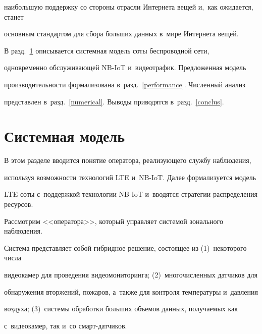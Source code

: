 наибольшую поддержку со стороны отрасли Интернета вещей и,~как ожидается, станет 


основным стандартом для сбора больших данных в~мире Интернета вещей.


{





}





В разд.~\ref{sys} описывается системная модель соты беспроводной сети, 


одновременно обслуживающей NB-IoT и~видеотрафик. Предложенная модель 


производительности формализована в~разд.~\ref{performance}. Численный анализ 


представлен в~разд.~\ref{numerical}. Выводы приводятся в~разд.~\ref{conclus}.





\section{Системная модель}


\label{sys}





В этом разделе вводится понятие оператора, реализующего службу наблюдения, 


используя возможности технологий LTE и~NB-IoT. Далее формализуется модель 


LTE-со\-ты с~поддержкой технологии NB-IoT и~вводятся стратегии распределения ресурсов.





Рассмотрим <<оператора>>, который управляет системой зонального наблюдения. 


Система представляет собой гибридное решение, состоящее из (1)~некоторого числа 


видеокамер для проведения видеомониторинга; (2)~многочисленных датчиков для 


обнаружения вторжений, пожаров, а~также для контроля температуры и~давления 


воздуха; (3)~системы обработки больших объемов данных, по\-лу\-ча\-емых как 


с~видеокамер, так и~со смарт-дат\-чиков.





